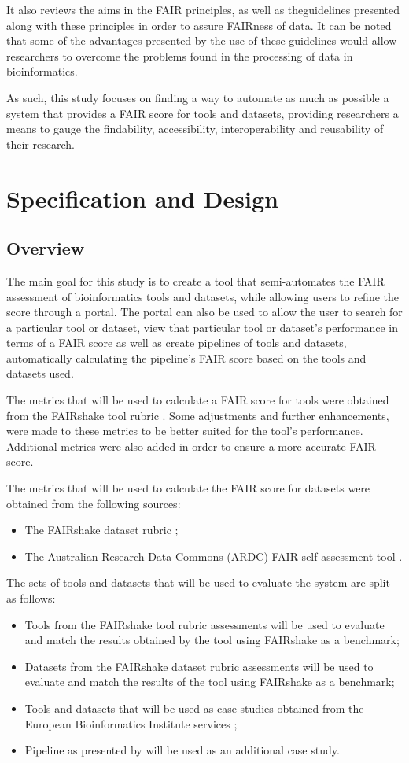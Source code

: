 \documentclass{cisfyp}
\begin{document}
It also reviews the aims in the FAIR principles, as well as the\newline guidelines presented along with these principles in order to assure FAIRness of data. It can be noted that some of the advantages presented by the use of these guidelines would allow researchers to overcome the problems found in the processing of data in bioinformatics. 

As such, this study focuses on finding a way to automate as much as possible a system that provides a FAIR score for tools and datasets, providing researchers a means to gauge the findability, accessibility, interoperability and reusability of their research. 
\pagebreak
\chapter{Specification and Design}
\section{Overview}
The main goal for this study is to create a tool that semi-automates the FAIR assessment of bioinformatics tools and datasets, while allowing users to refine the score through a portal. The portal can also be used to allow the user to search for a particular tool or dataset, view that particular tool or dataset's performance in terms of a FAIR score as well as create pipelines of tools and datasets, automatically calculating the pipeline's FAIR score based on the tools and datasets used. 

The metrics that will be used to calculate a FAIR score for tools were obtained from the FAIRshake tool rubric \cite{FAIRshake}. Some adjustments and further enhancements, were made to these metrics to be better suited for the tool's performance. Additional metrics were also added in order to ensure a more accurate FAIR score.

The metrics that will be used to calculate the FAIR score for datasets were obtained from the following sources:
\begin{itemize}
	\item The FAIRshake dataset rubric \cite{FAIRshake};
	\item  The Australian Research Data Commons (ARDC) FAIR self-assessment tool \cite{ands}.
\end{itemize}

The sets of tools and datasets that will be used to evaluate the system are split as follows:
\begin{itemize}
	\item Tools from the FAIRshake tool rubric assessments \cite{FAIRshake} will be used to evaluate and match the results obtained by the tool using FAIRshake as a benchmark;
	\item Datasets from the FAIRshake dataset rubric assessments \cite{FAIRshake} will be used to evaluate and match the results of the tool using FAIRshake as a benchmark;
	\item Tools and datasets that will be used as case studies obtained from the European Bioinformatics Institute services \cite{ebi};
	\item Pipeline as presented by \cite{Barber2012} will be used as an additional case study.
\end{itemize}
\end{document}
